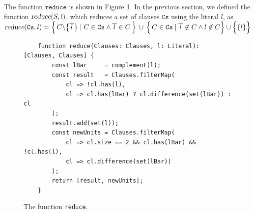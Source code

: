 The function $\texttt{reduce}$  is shown in Figure \ref{fig:reduce}.
In the previous section, we defined the function $\textsl{reduce}(S, l)$, which reduces a
set of clauses $\texttt{Cs}$ using the literal $l$, as
\\[0.2cm]
\hspace*{1.3cm}
$\textsl{reduce}(\texttt{Cs},l)  = 
 \Bigl\{\, C \backslash \bigl\{\overline{\,l\,}\bigr\} \;|\; C \in \texttt{Cs} \wedge \overline{\,l\,} \in C \,\Bigr\} 
       \,\cup\, \Bigl\{\, C \in \texttt{Cs} \mid \overline{\,l\,} \not\in C \wedge l \not\in C \Bigr\} \cup \Bigl\{\{l\}\Bigr\}
$
\\[0.2cm]
\begin{figure}[!ht]
  \centering
\begin{verbatim}
    function reduce(Clauses: Clauses, l: Literal): [Clauses, Clauses] {
        const lBar     = complement(l);
        const result   = Clauses.filterMap(
            cl => !cl.has(l),
            cl => cl.has(lBar) ? cl.difference(set(lBar)) : cl
        );
        result.add(set(l));
        const newUnits = Clauses.filterMap(
            cl => cl.size == 2 && cl.has(lBar) && !cl.has(l),
            cl => cl.difference(set(lBar))
        );
        return [result, newUnits];
    }
\end{verbatim}
\vspace*{-0.3cm}
  \caption{The function \texttt{reduce}. }
  \label{fig:reduce}
\end{figure}
